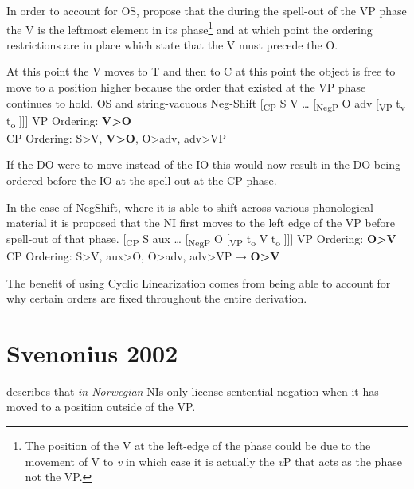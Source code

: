 \documentclass[12pt, letterpaper]{article}
\begin{document}
\ex In order to account for OS, \citeauthor{foxCyclicLinearizationSyntactic2005} propose that the during the spell-out of the VP phase the V is the leftmost element in its phase\footnote{The position of the V at the left-edge of the phase could be due to the movement of V to \textit{v} in which case it is actually the \textit{v}P that acts as the phase not the VP.} and at which point the ordering restrictions are in place which state that the V must precede the O. 

\ex At this point the V moves to T and then to C at this point the object is free to move to a position higher because the order that existed at the VP phase continues to hold. 
\ex OS and string-vacuous Neg-Shift
\vspace{6pt}
 	\ea {}[\textsubscript{CP} S V … [\textsubscript{NegP} O adv [\textsubscript{VP} t\textsubscript{v} t\textsubscript{o} ]]]
	\vspace{6pt}
	\ex VP Ordering: \textbf{V>O}\\
		CP Ordering: S>V, \textbf{V>O}, O>adv, adv>VP
	\z

\ex If the DO were to move instead of the IO this would now result in the DO being ordered before the IO at the spell-out at the CP phase. 

\ex In the case of NegShift, where it is able to shift across various phonological material it is proposed that the NI first moves to the left edge of the VP before spell-out of that phase. 
\vspace{6pt}
	\ea {}[\textsubscript{CP} S aux … [\textsubscript{NegP} O [\textsubscript{VP} t\textsubscript{o}  V t\textsubscript{o} ]]]
	\ex VP Ordering: \textbf{O>V}\\
	CP Ordering: S>V, aux>O, O>adv, adv>VP → \textbf{O>V}
	\z

\ex The benefit of using Cyclic Linearization comes from being able to account for why certain orders are fixed throughout the entire derivation.
\z 

\section*{Svenonius 2002}

\ea	\citet{svenoniusStrainsNegationNorwegian2002} describes that \emph{in Norwegian} NIs only license sentential negation when it has moved to a position outside of the VP. 
\end{document}
